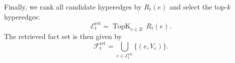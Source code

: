 Finally, we rank all candidate hyperedges by $R_t(e)$ and select the top-$k$ hyperedges:
\begin{equation}
    \mathcal{E}_t^{\mathrm{ret}} = \operatorname{TopK}_{e \in E}\, R_t(e).
\end{equation}
The retrieved fact set is then given by
\begin{equation}
    \mathcal{F}_t^{\mathrm{ret}}
    =
    \bigcup_{e \in \mathcal{E}_t^{\mathrm{ret}}}
    \{(e, V_e)\}.
\end{equation}
